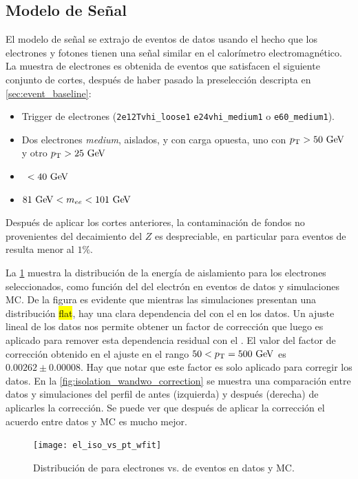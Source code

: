 \subsection{Modelo de Señal} \label{sec:jfake_sig_template}

El modelo de señal se extrajo de eventos de datos {\Zee} usando el hecho que los
electrones y fotones tienen una señal similar en el calorímetro
electromagnético. La muestra de electrones es obtenida de eventos que satisfacen
el siguiente conjunto de cortes, después de haber pasado la preselección
descripta en \cref{sec:event_baseline}:

\begin{itemize}\itemsep0.1cm
\item Trigger de electrones (\texttt{2e12Tvhi\_loose1} \texttt{e24vhi\_medium1} o
  \texttt{e60\_medium1}).
\item Dos electrones \emph{medium}, aislados, y con carga opuesta, uno con $\pt>50\gev$
  y otro $\pt>25 \gev$
\item \MET\ $<40\gev$
\item $81\gev<m_{ee}<101\gev$
\end{itemize}

Después de aplicar los cortes anteriores, la contaminación de fondos no
provenientes del decaimiento del $Z$ es despreciable, en particular para eventos
de {\ttbar} resulta menor al $1\%$.

La \cref{fig:isolation_vs_pt} muestra la distribución de la energía de
aislamiento para los electrones seleccionados, como función del {\pt} del
electrón en eventos de datos y simulaciones MC. De la figura es evidente que
mientras las simulaciones presentan una distribución \hl{flat}, hay una clara
dependencia del {\etiso} con el {\pt} en los datos. Un ajuste lineal de los
datos nos permite obtener un factor de corrección que luego es aplicado para
remover esta dependencia residual con el \pt. El valor del factor de corrección
obtenido en el ajuste en el rango $50<\pt=500 \gev$ es $0.00262 \pm 0.00008$.
Hay que notar que este factor es solo aplicado para corregir los datos. En la
\cref{fig:isolation_wandwo_correction} se muestra una comparación entre datos y
simulaciones del perfil de {\etiso} antes (izquierda) y después (derecha) de
aplicarles la corrección. Se puede ver que después de aplicar la corrección el
acuerdo entre datos y MC es mucho mejor.

\begin{figure}[!htbp]
  \centering

  \texttt{[image: el\_iso\_vs\_pt\_wfit]}

  \caption{Distribución de {\etiso} para electrones vs. {\pt} de eventos {\Zee} en datos y MC.}
  \label{fig:isolation_vs_pt}
\end{figure}

